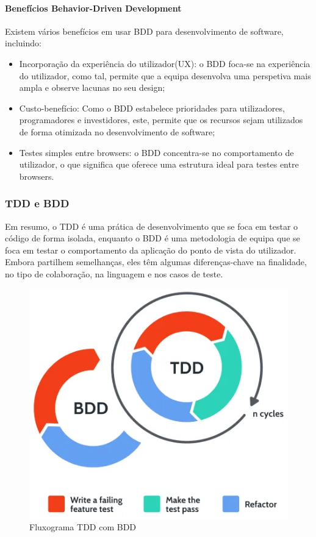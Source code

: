 \documentclass[a4paper,12pt]{article} %
\begin{document}
\paragraph{Benefícios Behavior-Driven Development}
Existem vários benefícios em usar BDD para desenvolvimento de software, incluindo:

\begin{itemize}
	\item Incorporação da experiência do utilizador(UX): o BDD foca-se na experiência do utilizador, como tal, permite que a equipa desenvolva uma perspetiva mais ampla e observe lacunas no seu design;
	\item Custo-benefício: Como o BDD estabelece prioridades para utilizadores, programadores e investidores, este, permite que os recursos sejam utilizados de forma otimizada no desenvolvimento de software;
	\item Testes simples entre browsers: o BDD concentra-se no comportamento de utilizador, o que significa que oferece uma estrutura ideal para testes entre browsers.
\end{itemize}

\newpage
\subsubsection{TDD e BDD}
Em resumo, o TDD é uma prática de desenvolvimento que se foca em testar o código de forma isolada, enquanto o BDD é uma metodologia de equipa que se foca em testar o comportamento da aplicação do ponto de vista do utilizador. Embora partilhem semelhanças, eles têm algumas diferenças-chave na finalidade, no tipo de colaboração, na linguagem e nos casos de teste.

\vspace{1cm}
\begin{figure}[H]
	\centering
	\includegraphics[scale=0.7]{images/tdd-bdd.png}
	\caption[Fluxograma TDD com BDD]{Fluxograma TDD com BDD\footnotemark}
\end{figure}
\end{document}
